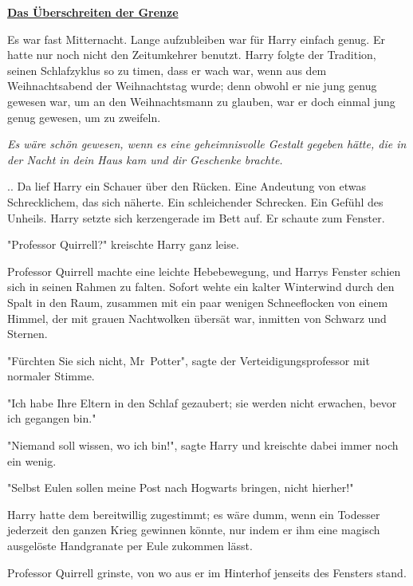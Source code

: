 

\hypertarget{das-uxfcberschreiten-der-grenze}{%

\textbf{\uline{Das Überschreiten der Grenze}}

Es war fast Mitternacht. Lange aufzubleiben war für Harry einfach genug. Er hatte nur noch nicht den Zeitumkehrer benutzt. Harry folgte der Tradition, seinen Schlafzyklus so zu timen, dass er wach war, wenn aus dem Weihnachtsabend der Weihnachtstag wurde; denn obwohl er nie jung genug gewesen war, um an den Weihnachtsmann zu glauben, war er doch einmal jung genug gewesen, um zu zweifeln.

\emph{Es wäre schön gewesen, wenn es eine geheimnisvolle Gestalt gegeben hätte, die in der Nacht in dein Haus kam und dir Geschenke brachte.}

.. Da lief Harry ein Schauer über den Rücken. Eine Andeutung von etwas Schrecklichem, das sich näherte. Ein schleichender Schrecken. Ein Gefühl des Unheils. Harry setzte sich kerzengerade im Bett auf. Er schaute zum Fenster.

"Professor Quirrell?" kreischte Harry ganz leise.

Professor Quirrell machte eine leichte Hebebewegung, und Harrys Fenster schien sich in seinen Rahmen zu falten. Sofort wehte ein kalter Winterwind durch den Spalt in den Raum, zusammen mit ein paar wenigen Schneeflocken von einem Himmel, der mit grauen Nachtwolken übersät war, inmitten von Schwarz und Sternen.

"Fürchten Sie sich nicht, Mr~Potter", sagte der Verteidigungsprofessor mit normaler Stimme.

"Ich habe Ihre Eltern in den Schlaf gezaubert; sie werden nicht erwachen, bevor ich gegangen bin."

"Niemand soll wissen, wo ich bin!", sagte Harry und kreischte dabei immer noch ein wenig.

"Selbst Eulen sollen meine Post nach Hogwarts bringen, nicht hierher!"

Harry hatte dem bereitwillig zugestimmt; es wäre dumm, wenn ein Todesser jederzeit den ganzen Krieg gewinnen könnte, nur indem er ihm eine magisch ausgelöste Handgranate per Eule zukommen lässt.

Professor Quirrell grinste, von wo aus er im Hinterhof jenseits des Fensters stand.

}

